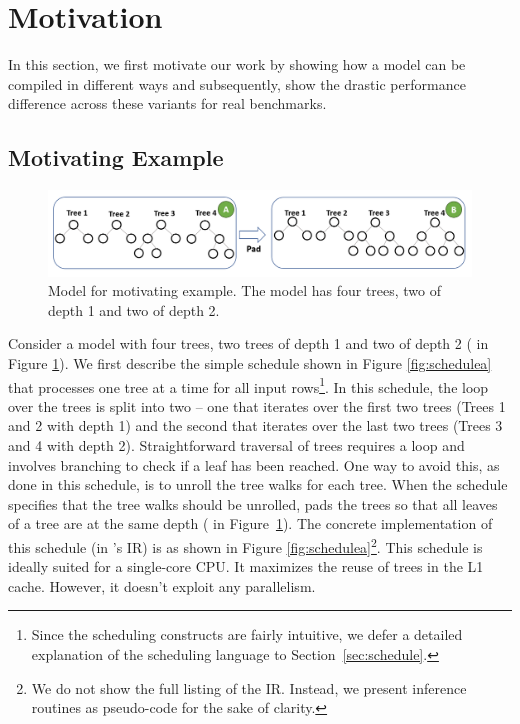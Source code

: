 \section{Motivation}
\label{sec:motivation}
In this section, we first motivate our work by showing how a model can be compiled in different ways
and subsequently, show the drastic performance difference across these variants for real benchmarks.

\subsection{Motivating Example}
\begin{figure}[htb]
  \centering
  \includegraphics[width=\linewidth]{figures/HIR.PNG}
  \caption{Model for motivating example. The model has four trees, two of depth 1 and two of depth 2.}
  \label{Fig:HIRExample}
\end{figure}

Consider a model with four trees, two 
trees of depth 1 and two of depth 2 ( in Figure \ref{Fig:HIRExample}).
We first describe the simple schedule shown in Figure \ref{fig:schedulea} that processes one tree at a time 
for all input rows\footnote{Since the scheduling constructs are fairly intuitive, we 
defer a detailed explanation of the scheduling language to Section~\ref{sec:schedule}.}.
In this schedule, the loop over the trees is split into two -- one that
iterates over the first two trees (Trees 1 and 2 with depth 1) and 
the second that iterates over the last two trees (Trees 3 and 4 with
depth 2). Straightforward traversal of trees requires a  loop
and involves branching to check if a leaf has been reached. 
One way to avoid this, as done in this schedule, is to unroll the 
tree walks for each tree. 
When the schedule specifies that the tree walks should be unrolled, 
\Treebeard{} pads the trees so that all leaves of a tree are at the same depth
( in Figure~\ref{Fig:HIRExample}). 
The concrete implementation of this schedule (in \Treebeard{}'s IR) 
is as shown in Figure \ref{fig:schedulea}\footnote{We do not show 
the full listing of the IR. Instead, we present inference routines 
as pseudo-code for the sake of clarity.}.
This schedule is ideally suited for a single-core CPU. It maximizes 
the reuse of trees in the L1 cache. However, it doesn't exploit  
any parallelism. 

